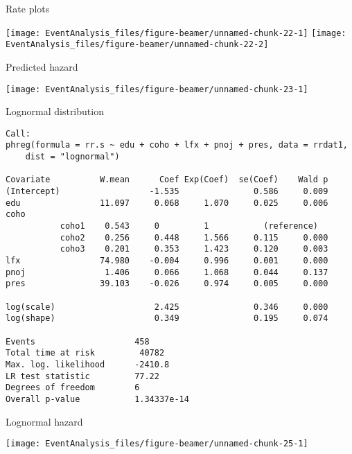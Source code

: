 \documentclass[10pt,ignorenonframetext,]{beamer}
\begin{document}
\begin{frame}{Rate plots}

\texttt{[image: EventAnalysis\_files/figure-beamer/unnamed-chunk-22-1]}
\texttt{[image: EventAnalysis\_files/figure-beamer/unnamed-chunk-22-2]}

\end{frame}

\begin{frame}{Predicted hazard}

\begin{center}\texttt{[image: EventAnalysis\_files/figure-beamer/unnamed-chunk-23-1]} \end{center}

\end{frame}

\begin{frame}[fragile]{Lognormal distribution}

\tiny

\begin{verbatim}
Call:
phreg(formula = rr.s ~ edu + coho + lfx + pnoj + pres, data = rrdat1, 
    dist = "lognormal")

Covariate          W.mean      Coef Exp(Coef)  se(Coef)    Wald p
(Intercept)                  -1.535               0.586     0.009 
edu                11.097     0.068     1.070     0.025     0.006 
coho 
           coho1    0.543     0         1           (reference)
           coho2    0.256     0.448     1.566     0.115     0.000 
           coho3    0.201     0.353     1.423     0.120     0.003 
lfx                74.980    -0.004     0.996     0.001     0.000 
pnoj                1.406     0.066     1.068     0.044     0.137 
pres               39.103    -0.026     0.974     0.005     0.000 

log(scale)                    2.425               0.346     0.000 
log(shape)                    0.349               0.195     0.074 

Events                    458 
Total time at risk         40782 
Max. log. likelihood      -2410.8 
LR test statistic         77.22 
Degrees of freedom        6 
Overall p-value           1.34337e-14
\end{verbatim}

\end{frame}

\begin{frame}{Lognormal hazard}

\begin{center}\texttt{[image: EventAnalysis\_files/figure-beamer/unnamed-chunk-25-1]} \end{center}

\end{frame}
\end{document}

